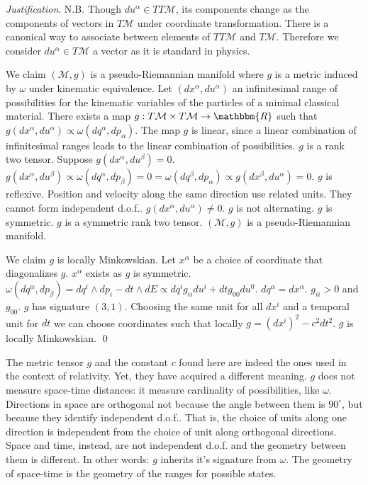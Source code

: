 \documentclass[aps,pra,10pt,twocolumn,floatfix,nofootinbib]{revtex4-1}
\numberwithin{equation}{section}
\theoremstyle{definition}
\newenvironment{justification}{\emph{Justification}.}{\qed}
\begin{document}
\begin{justification}
	N.B. Though $du^\alpha \in TT\mathcal{M}$, its components change as the components of vectors in $T\mathcal{M}$ under coordinate transformation. There is a canonical way to associate between elements of $TT\mathcal{M}$ and $T\mathcal{M}$. Therefore we consider $du^\alpha \in T\mathcal{M}$ a vector as it is standard in physics.
	
	We claim $(\mathcal{M}, g)$ is a pseudo-Riemannian manifold where $g$ is a metric induced by $\omega$ under kinematic equivalence. Let $(dx^\alpha, du^\alpha)$ an infinitesimal range of possibilities for the kinematic variables of the particles of a minimal classical material. There exists a map $g : T\mathcal{M} \times T\mathcal{M} \rightarrow \mathbbm{R}$ such that $g(dx^\alpha, du^\alpha) \propto \omega(dq^\alpha, dp_\alpha)$. The map $g$ is linear, since a linear combination of infinitesimal ranges leads to the linear combination of possibilities. $g$ is a rank two tensor. Suppose $g(dx^\alpha, du^\beta) = 0$. $g(dx^\alpha, du^\beta) \propto \omega(dq^\alpha, dp_\beta) = 0 = \omega(dq^\beta, dp_\alpha) \propto g(dx^\beta, du^\alpha) = 0$. $g$ is reflexive. Position and velocity along the same direction use related units. They cannot form independent d.o.f.. $g(dx^\alpha, du^\alpha) \neq 0$. $g$ is not alternating. $g$ is symmetric. $g$ is a symmetric rank two tensor. $(\mathcal{M}, g)$ is a pseudo-Riemannian manifold.
	
	We claim $g$ is locally Minkowskian. Let $x^\alpha$ be a choice of coordinate that diagonalizes $g$. $x^\alpha$ exists as $g$ is symmetric. $\omega(dq^\alpha, dp_\beta) = dq^i \wedge dp_i - dt \wedge dE \propto dq^i g_{ii} du^i + dt g_{00} du^0$. $dq^\alpha = dx^\alpha$. $g_{ii} > 0$ and $g_{00}$. $g$ has signature $(3, 1)$. Choosing the same unit for all $dx^i$ and a temporal unit for $dt$ we can choose coordinates such that locally $g = (dx^i)^2 - c^2 dt^2$. $g$ is locally Minkowskian.
\end{justification}

The metric tensor $g$ and the constant $c$ found here are indeed the ones used in the context of relativity. Yet, they have acquired a different meaning. $g$ does not measure space-time distances: it measure cardinality of possibilities, like $\omega$. Directions in space are orthogonal not because the angle between them is $90^\circ$, but because they identify independent d.o.f.. That is, the choice of units along one direction is independent from the choice of unit along orthogonal directions. Space and time, instead, are not independent d.o.f. and the geometry between them is different. In other words: $g$ inherits it's signature from $\omega$. The geometry of space-time is the geometry of the ranges for possible states.
\end{document}
